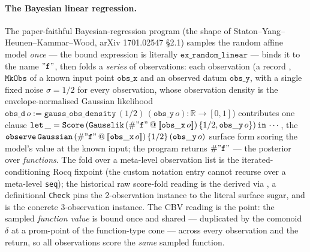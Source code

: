 \paragraph{The Bayesian linear regression.}
The paper-faithful Bayesian-regression program
 (the shape of
Staton--Yang--Heunen--Kammar--Wood, arXiv 1701.02547 \S2.1) samples
the random affine model \emph{once} --- the bound expression is
literally $\mathtt{ex\_random\_linear}$ --- binds it to the name
$\mathtt{"f"}$, then folds a \emph{series} of observations: each
observation (a record , $\mathtt{MkObs}$
of a known input point $\mathtt{obs\_x}$ and an observed datum
$\mathtt{obs\_y}$, with a single fixed noise $\sigma = 1/2$ for every
observation, whose observation density is the envelope-normalised
Gaussian likelihood
$\mathtt{obs\_d}\,o := \mathtt{gauss\_obs\_density}\,(1/2)\,
(\mathtt{obs\_y}\,o) : \mathbb{R} \to [0,1]$) contributes one clause
$\mathtt{let\,\_ = Score\,(Gausslik}\,
(\#\mathtt{"f"} \mathbin{@} [\![\mathtt{obs\_x}\,o]\!])\,
\{1/2, \mathtt{obs\_y}\,o\})
\,\mathtt{in}\,\cdots$, the $\mathtt{observe\,Gaussian}\,
(\#\mathtt{"f"} \mathbin{@} [\![\mathtt{obs\_x}\,o]\!])\,\{1/2\}\,
(\mathtt{obs\_y}\,o)$ surface form scoring the model's value at the
known input;
the program returns $\#\mathtt{"f"}$ --- the posterior over
\emph{functions}. The fold over a meta-level observation list is the
iterated-conditioning Rocq fixpoint
 (the custom notation
entry cannot recurse over a meta-level \texttt{seq}); the historical
raw score-fold reading is the derived
 via
, a definitional
\texttt{Check} pins the 2-observation instance to the literal
surface sugar, and
 is the concrete
3-observation instance. The CBV reading is the point: the sampled
\emph{function value} is bound once and shared --- duplicated by the
comonoid $\delta$ at a prom-point of the function-type cone --- across
every observation and the return, so all observations score the
\emph{same} sampled function.

